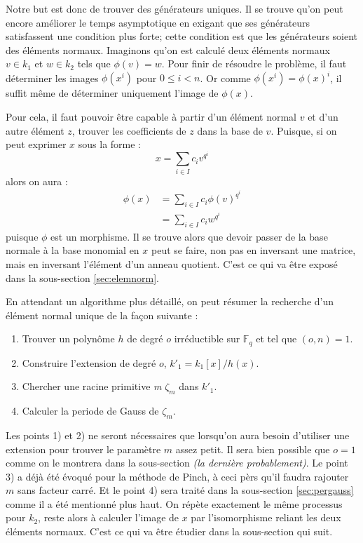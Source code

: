 \documentclass[a4paper]{article} %
\numberwithin{section}{part}
\numberwithin{equation}{section}
\newcommand\nroot[1]{\textit{#1}\up{\textit{ième}}}
\newcommand\GF[1]{\mathbb{F}_{#1}}
\begin{document}
Notre but est donc de trouver des générateurs uniques. Il se trouve qu'on peut
encore améliorer le temps asymptotique en exigant que ses générateurs
satisfassent une condition plus forte; cette condition est que les générateurs
soient des éléments normaux. Imaginons qu'on est calculé deux éléments normaux
$v\in k_1$ et $w\in k_2$ tels que $\phi(v) = w$. Pour finir de résoudre
le problème, il faut déterminer les images $\phi(x^i)$ pour $0\leq i < n$. Or
comme $\phi(x^i) = \phi(x)^i$, il suffit même de déterminer uniquement l'image
de $\phi(x)$.\par
Pour cela, il faut pouvoir être capable à partir d'un élément normal $v$ et d'un
autre élément $z$, trouver les coefficients de $z$ dans la base de $v$. Puisque,
si on peut exprimer $x$ sous la forme :
\[x = \sum_{i\in I}{c_iv^{q^i}}\]
alors on aura :
\begin{align*}
\phi(x) &= \sum_{i\in I}{c_i\phi(v)^{q^i}}\\
&= \sum_{i\in I}{c_iw^{q^i}}
\end{align*}
puisque $\phi$ est un morphisme. Il se trouve alors que devoir passer de la base
normale à la base monomial en $x$ peut se faire, non pas en inversant une
matrice, mais en inversant l'élément d'un anneau quotient. C'est ce qui va être
exposé dans la sous-section \ref{sec:elemnorm}.\par
En attendant un algorithme plus détaillé, on peut résumer la recherche d'un
élément normal unique de la façon suivante :
\vspace{0.3cm}
\begin{enumerate}[1)]
\item Trouver un polynôme $h$ de degré $o$ irréductible sur $\GF{q}$ et tel que 
$(o, n) = 1$.

\item Construire l'extension de degré $o$, $k'_1 = k_1[x]/h(x)$.

\item Chercher une racine primitive \nroot{m} $\zeta_m$ dans $k'_1$.

\item Calculer la periode de Gauss de $\zeta_m$.
\end{enumerate}
\vspace{0.3cm}
Les points 1) et 2) ne seront nécessaires que lorsqu'on aura besoin d'utiliser
une extension pour trouver le paramètre $m$ assez petit. Il sera bien possible
que $o = 1$ comme on le montrera dans la sous-section \textit{(la dernière
probablement)}. Le point 3) a déjà été évoqué pour la méthode de Pinch, à ceci
pèrs qu'il faudra rajouter $m$ sans facteur carré. Et le point 4) sera traité 
dans la sous-section \ref{sec:pergauss} comme il a été mentionné plus haut. On 
répète exactement le même processus pour $k_2$, reste alors à calculer l'image 
de $x$ par l'isomorphisme reliant les deux éléments normaux. C'est ce qui va 
être étudier dans la sous-section qui suit.
\end{document}
